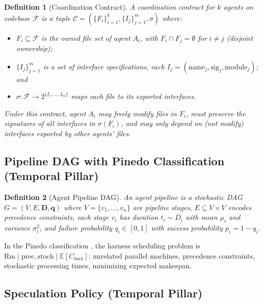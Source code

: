 \documentclass[11pt, a4paper]{googledeepmind}
\newcommand{\E}{\mathbb{E}}
\newtheorem{definition}{Definition}[section]
\begin{document}
\begin{appendices}
\begin{definition}[Coordination Contract]
\label{def:ext-contract}
A \emph{coordination contract} for $k$ agents on codebase $\mathcal{F}$ is a
tuple $\mathcal{C} = (\{F_i\}_{i=1}^k, \{I_j\}_{j=1}^m, \sigma)$ where:
\begin{itemize}[nosep]
  \item $F_i \subseteq \mathcal{F}$ is the owned file set of agent $A_i$,
        with $F_i \cap F_j = \emptyset$ for $i \neq j$ (disjoint ownership);
  \item $\{I_j\}_{j=1}^m$ is a set of interface specifications,
        each $I_j = (\mathrm{name}_j, \mathrm{sig}_j, \mathrm{module}_j)$; and
  \item $\sigma: \mathcal{F} \to 2^{\{I_1,\ldots,I_m\}}$ maps each file to its
        exported interfaces.
\end{itemize}
Under this contract, agent $A_i$ may freely modify files in $F_i$,
must preserve the signatures of all interfaces in $\sigma(F_i)$,
and may only depend on (not modify) interfaces exported by other agents' files.
\end{definition}


\subsection{Pipeline DAG with Pinedo Classification (Temporal Pillar)}

\begin{definition}[Agent Pipeline DAG]
\label{def:ext-pipeline}
An agent pipeline is a stochastic DAG $G = (V, E, \mathbf{D}, \mathbf{q})$ where
$V = \{v_1, \ldots, v_n\}$ are pipeline stages,
$E \subseteq V \times V$ encodes precedence constraints,
each stage $v_i$ has duration $t_i \sim D_i$ with mean $\mu_i$ and
variance $\sigma_i^2$, and failure probability $q_i \in [0,1]$
with success probability $p_i = 1 - q_i$.
\end{definition}

In the Pinedo classification \citep{pinedo2016scheduling}, the harness scheduling
problem is $\mathrm{Rm} \mid \mathrm{prec}, \mathrm{stoch} \mid \E[C_{\max}]$:
unrelated parallel machines, precedence constraints, stochastic processing times,
minimizing expected makespan.


\subsection{Speculation Policy (Temporal Pillar)}


\end{appendices}
\end{document}
